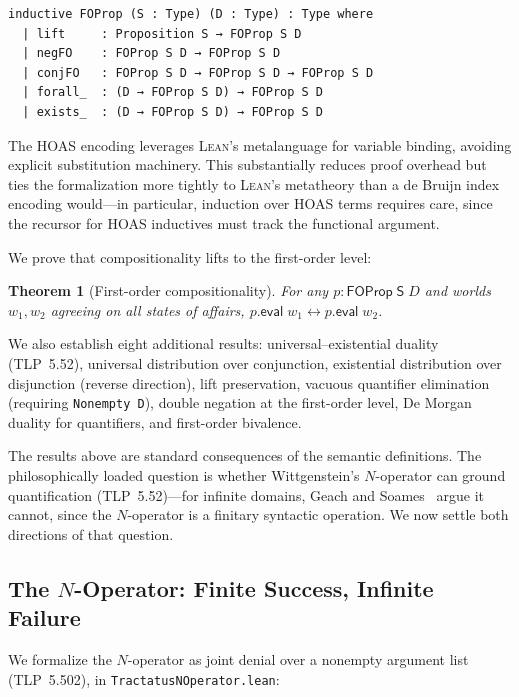 \documentclass[10pt, letterpaper]{article}
\newtheorem{theorem}{Theorem}[section]
\theoremstyle{definition}
\theoremstyle{remark}
\newcommand{\Sach}{\mathsf{S}}
\newcommand{\eval}{\mathsf{eval}}
\newcommand{\Lean}{\textsc{Lean}}
\begin{document}
\begin{lstlisting}
inductive FOProp (S : Type) (D : Type) : Type where
  | lift     : Proposition S → FOProp S D
  | negFO    : FOProp S D → FOProp S D
  | conjFO   : FOProp S D → FOProp S D → FOProp S D
  | forall_  : (D → FOProp S D) → FOProp S D
  | exists_  : (D → FOProp S D) → FOProp S D
\end{lstlisting}

\noindent
The HOAS encoding leverages \Lean's metalanguage for variable
binding, avoiding explicit substitution machinery.  This
substantially reduces proof overhead but ties the formalization
more tightly to \Lean's metatheory than a de Bruijn index
encoding would---in particular, induction over HOAS terms
requires care, since the recursor for HOAS inductives must track
the functional argument.

We prove that compositionality lifts to the first-order level:

\begin{theorem}[First-order compositionality]
\label{thm:fo-comp}
For any $p : \mathsf{FOProp}\;\Sach\;D$ and worlds $w_1, w_2$
agreeing on all states of affairs, $p.\eval\;w_1 \leftrightarrow
p.\eval\;w_2$.
\end{theorem}

\noindent
We also establish eight additional results: universal--existential
duality (TLP~5.52), universal distribution over conjunction,
existential distribution over disjunction (reverse direction),
lift preservation, vacuous quantifier elimination (requiring
\texttt{Nonempty D}), double negation at the first-order level,
De Morgan duality for quantifiers, and first-order bivalence.

The results above are standard consequences of the semantic
definitions.  The philosophically loaded question is whether
Wittgenstein's $N$-operator can ground quantification
(TLP~5.52)---for infinite domains, Geach and
Soames~\cite{geach1981,soames1983} argue it cannot, since the
$N$-operator is a finitary syntactic operation.  We now settle
both directions of that question.

\subsection{The $N$-Operator: Finite Success, Infinite Failure}
\label{sec:noperator}

We formalize the $N$-operator as joint denial over a nonempty
argument list (TLP~5.502), in
\texttt{Tractatus\allowbreak{}NOperator\allowbreak{}.lean}:
\end{document}
